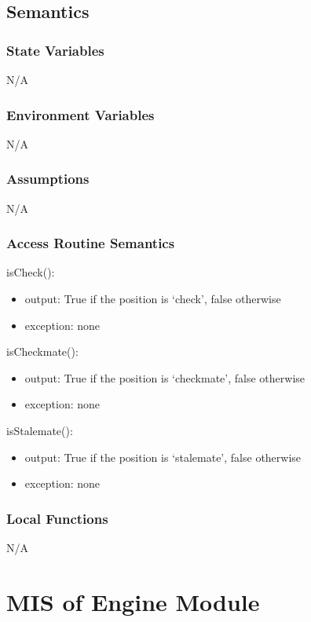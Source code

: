 \documentclass[12pt, titlepage]{article}
\begin{document}
    \subsection{Semantics}
    \subsubsection{State Variables}
    N/A

    \subsubsection{Environment Variables}
    N/A

    \subsubsection{Assumptions}
    N/A

    \subsubsection{Access Routine Semantics}
        \noindent isCheck():
        \begin{itemize}
            \item output: True if the position is `check', false otherwise
            \item exception: none
        \end{itemize}

        \noindent isCheckmate():
        \begin{itemize}
            \item output: True if the position is `checkmate', false otherwise
            \item exception: none
        \end{itemize}

        \noindent isStalemate():
        \begin{itemize}
            \item output: True if the position is `stalemate', false otherwise
            \item exception: none
        \end{itemize}

    \subsubsection{Local Functions}
    N/A

\newpage

\section{MIS of Engine Module} \label{mEngine}
\end{document}
